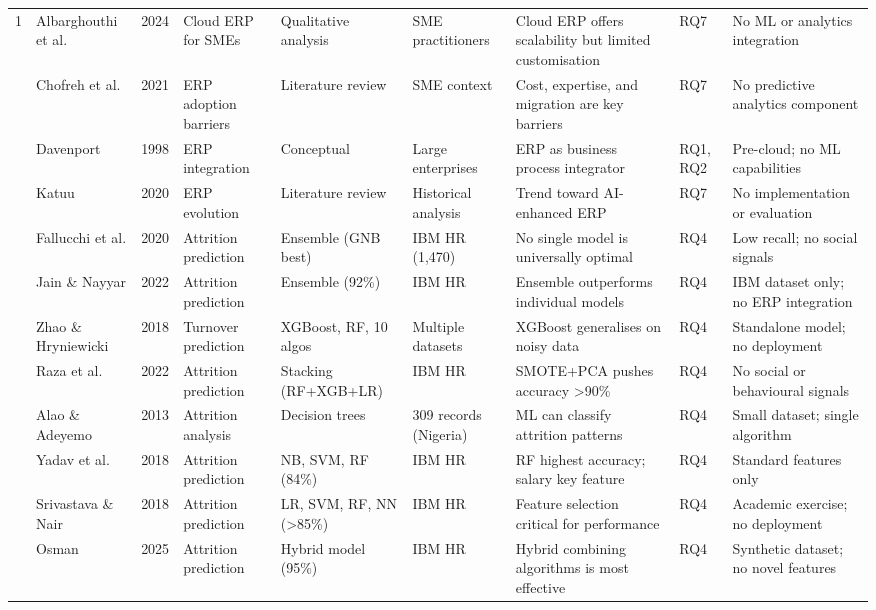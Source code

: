 \documentclass[12pt,a4paper]{article}
\begin{document}
\begin{landscape}
\begin{longtable}{C{0.4cm} L{2.0cm} C{0.6cm} L{1.8cm} L{2.2cm} L{1.8cm} L{2.8cm} C{0.9cm} L{2.8cm}}
1  & Albarghouthi et al. & 2024 & Cloud ERP for SMEs & Qualitative analysis & SME practitioners & Cloud ERP offers scalability but limited customisation & RQ7 & No ML or analytics integration \\
  & Chofreh et al. & 2021 & ERP adoption barriers & Literature review & SME context & Cost, expertise, and migration are key barriers & RQ7 & No predictive analytics component \\
  & Davenport & 1998 & ERP integration & Conceptual & Large enterprises & ERP as business process integrator & RQ1, RQ2 & Pre-cloud; no ML capabilities \\
  & Katuu & 2020 & ERP evolution & Literature review & Historical analysis & Trend toward AI-enhanced ERP & RQ7 & No implementation or evaluation \\
  & Fallucchi et al. & 2020 & Attrition prediction & Ensemble (GNB best) & IBM HR (1,470) & No single model is universally optimal & RQ4 & Low recall; no social signals \\
  & Jain \& Nayyar & 2022 & Attrition prediction & Ensemble (92\%) & IBM HR & Ensemble outperforms individual models & RQ4 & IBM dataset only; no ERP integration \\
  & Zhao \& Hryniewicki & 2018 & Turnover prediction & XGBoost, RF, 10 algos & Multiple datasets & XGBoost generalises on noisy data & RQ4 & Standalone model; no deployment \\
  & Raza et al. & 2022 & Attrition prediction & Stacking (RF+XGB+LR) & IBM HR & SMOTE+PCA pushes accuracy >90\% & RQ4 & No social or behavioural signals \\
  & Alao \& Adeyemo & 2013 & Attrition analysis & Decision trees & 309 records (Nigeria) & ML can classify attrition patterns & RQ4 & Small dataset; single algorithm \\
 & Yadav et al. & 2018 & Attrition prediction & NB, SVM, RF (84\%) & IBM HR & RF highest accuracy; salary key feature & RQ4 & Standard features only \\
 & Srivastava \& Nair & 2018 & Attrition prediction & LR, SVM, RF, NN (>85\%) & IBM HR & Feature selection critical for performance & RQ4 & Academic exercise; no deployment \\
 & Osman & 2025 & Attrition prediction & Hybrid model (95\%) & IBM HR & Hybrid combining algorithms is most effective & RQ4 & Synthetic dataset; no novel features \\

\end{longtable}
\end{landscape}
\end{document}
